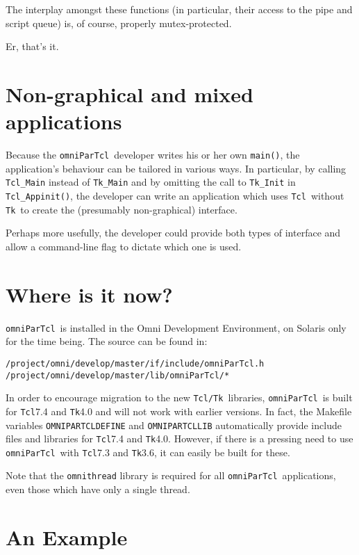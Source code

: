 \documentclass[11pt]{article}
\def\omniParTcl{{\tt omniParTcl}}
\def\tcltk{{\tt Tcl/Tk}}
\def\tcl{{\tt Tcl}}
\def\tk{{\tt Tk}}
\begin{document}
\noindent
The interplay amongst these functions (in particular, their access
to the pipe and script queue) is, of course, properly mutex-protected.

Er, that's it.

\section{Non-graphical and mixed applications}

Because the \omniParTcl\ developer writes his or her own {\tt main()},
the application's behaviour can be tailored in various ways.  In
particular, by calling {\tt Tcl\_Main} instead of {\tt Tk\_Main}
and by omitting the call to {\tt Tk\_Init} in 
{\tt Tcl\_Appinit()}, the developer can write an application which
uses \tcl\ without \tk\ to create the (presumably non-graphical) interface.

Perhaps more usefully, the developer could provide both types of interface
and allow a command-line flag to dictate which one is used.  

\section{Where is it now?}

\omniParTcl\ is installed in the Omni Development Environment,
on Solaris only for the time being.  The source can be found in:

\begin{verbatim}
/project/omni/develop/master/if/include/omniParTcl.h
/project/omni/develop/master/lib/omniParTcl/*
\end{verbatim}

In order to encourage migration to the new \tcltk\ libraries,
\omniParTcl\ is built for \tcl 7.4 and \tk 4.0 and will not
work with earlier versions.  In fact, the Makefile variables 
{\tt OMNIPARTCLDEFINE} and {\tt OMNIPARTCLLIB} automatically provide include
files and libraries for \tcl 7.4 and \tk 4.0.  However, if there is a
pressing need to use \omniParTcl\ with \tcl 7.3 and \tk 3.6, it can
easily be built for these.

Note that the {\tt omnithread} library is required for all \omniParTcl\ 
applications, even those which have only a single thread.

\section{An Example}
\end{document}
